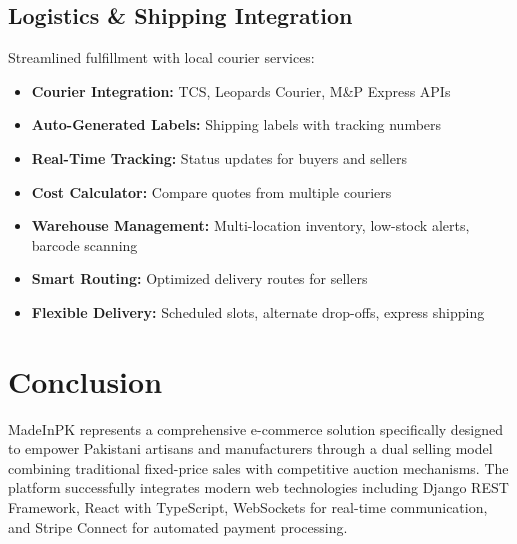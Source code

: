\documentclass[12pt,a4paper]{article}
\begin{document}
\subsection{Logistics \& Shipping Integration}
Streamlined fulfillment with local courier services:
\begin{itemize}
    \item \textbf{Courier Integration:} TCS, Leopards Courier, M\&P Express APIs
    \item \textbf{Auto-Generated Labels:} Shipping labels with tracking numbers
    \item \textbf{Real-Time Tracking:} Status updates for buyers and sellers
    \item \textbf{Cost Calculator:} Compare quotes from multiple couriers
    \item \textbf{Warehouse Management:} Multi-location inventory, low-stock alerts, barcode scanning
    \item \textbf{Smart Routing:} Optimized delivery routes for sellers
    \item \textbf{Flexible Delivery:} Scheduled slots, alternate drop-offs, express shipping
\end{itemize}

\newpage

\section{Conclusion}

MadeInPK represents a comprehensive e-commerce solution specifically designed to empower Pakistani artisans and manufacturers through a dual selling model combining traditional fixed-price sales with competitive auction mechanisms. The platform successfully integrates modern web technologies including Django REST Framework, React with TypeScript, WebSockets for real-time communication, and Stripe Connect for automated payment processing.
\end{document}

